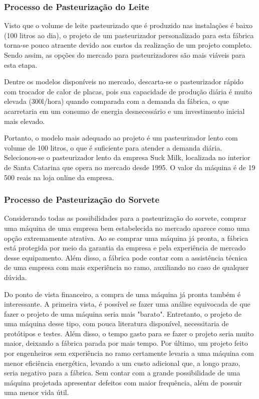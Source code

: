 \documentclass[10pt,a4paper]{article}
\begin{document}
\subsubsection{{Processo de Pasteurização do Leite }}

Visto que o volume de leite pasteurizado que é produzido nas instalações é baixo (100 litros ao dia), o projeto de um pasteurizador personalizado para esta fábrica torna-se pouco atraente devido aos custos da realização de um projeto completo. Sendo assim, as opções do mercado para pasteurizadores são mais viáveis para esta etapa.

Dentre os modelos disponíveis no mercado, descarta-se o pasteurizador rápido com trocador de calor de placas, pois sua capacidade de produção diária é muito elevada (300l/hora) quando comparada com a demanda da fábrica, o que acarretaria em um consumo de energia desnecessário e um investimento inicial mais elevado.

Portanto, o modelo mais adequado ao projeto é um pasteurizador lento com volume de 100 litros, o que é suficiente para atender a demanda diária. Selecionou-se o pasteurizador lento da empresa Suck Milk, localizada no interior de Santa Catarina que opera no mercado desde 1995. O valor da máquina é de 19 500 reais na loja online da empresa.

\subsubsection{{Processo de Pasteurização do Sorvete}}

Considerando todas as possibilidades para a pasteurização do sorvete, comprar uma máquina de uma empresa bem estabelecida no mercado aparece como uma opção extremamente atrativa. Ao se comprar uma máquina já pronta, a fábrica está protegida por meio da garantia da empresa e pela experiência de mercado desse equipamento. Além disso, a fábrica pode contar com a assistência técnica de uma empresa com mais experiência no ramo, auxiliando no caso de qualquer dúvida.

Do ponto de vista financeiro, a compra de uma máquina já pronta também é interessante. A primeira vista, é possível se fazer uma análise equivocada de que fazer o projeto de uma máquina seria mais "barato". Entretanto, o projeto de uma máquina desse tipo, com pouca literatura disponível, necessitaria de protótipos e testes. Além disso, o tempo gasto para se fazer o projeto seria muito maior, deixando a fábrica parada por mais tempo. Por último, um projeto feito por engenheiros sem experiência no ramo certamente levaria a uma máquina com menor eficiência energética, levando a um custo adicional que, a longo prazo, seria negativo para a fábrica. Sem contar com a grande possibilidade de uma máquina projetada apresentar defeitos com maior frequência, além de possuir uma menor vida útil.
\end{document}
